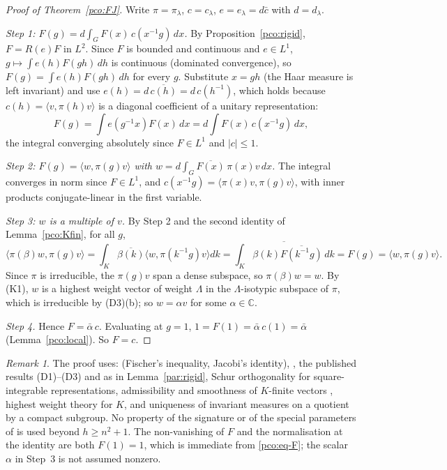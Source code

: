 \documentclass[10pt]{amsart}
\theoremstyle{definition}
\theoremstyle{remark}
\newtheorem{remark}[theorem]{Remark}
\newcommand{\C}{\mathbb C}
\begin{document}
\begin{proof}[Proof of Theorem~\ref{pco:FJ}]
Write $\pi=\pi_\lambda$, $c=c_\lambda$, $e=e_\lambda=d\bar c$ with $d=d_\lambda$.

\emph{Step 1: $F(g)=d\int_GF(x)\,c(x^{-1}g)\,dx$.} By Proposition~\ref{pco:rigid}, $F=R(e)F$ in
$L^2$. Since $F$ is bounded and continuous and $e\in L^1$, $g\mapsto\int e(h)F(gh)\,dh$ is
continuous (dominated convergence), so $F(g)=\int e(h)F(gh)\,dh$ for every $g$. Substitute $x=gh$
(the Haar measure is left invariant) and use $e(h)=d\,\overline{c(h)}=d\,c(h^{-1})$, which holds
because $c(h)=\langle v,\pi(h)v\rangle$ is a diagonal coefficient of a unitary representation:
\[
F(g)=\int e(g^{-1}x)F(x)\,dx=d\int F(x)\,c(x^{-1}g)\,dx ,
\]
the integral converging absolutely since $F\in L^1$ and $|c|\le1$.

\emph{Step 2: $F(g)=\langle w,\pi(g)v\rangle$ with $w=d\int_G\overline{F(x)}\,\pi(x)v\,dx$.} The
integral converges in norm since $F\in L^1$, and $c(x^{-1}g)=\langle\pi(x)v,\pi(g)v\rangle$, with inner
products conjugate-linear in the first variable.

\emph{Step 3: $w$ is a multiple of $v$.} By Step 2 and the second identity of Lemma~\ref{pco:Kfin},
for all $g$,
\[
\langle\pi(\beta)w,\pi(g)v\rangle=\int_K\overline{\beta(k)}\langle w,\pi(k^{-1}g)v\rangle dk
=\overline{\int_K\beta(k)\overline{F(k^{-1}g)}\,dk}=F(g)=\langle w,\pi(g)v\rangle .
\]
Since $\pi$ is irreducible, the $\pi(g)v$ span a dense subspace, so $\pi(\beta)w=w$. By (K1), $w$ is
a highest weight vector of weight $\Lambda$ in the $\Lambda$-isotypic subspace of $\pi$, which is
irreducible by (D3)(b); so $w=\alpha v$ for some $\alpha\in\C$.

\emph{Step 4.} Hence $F=\bar\alpha\,c$. Evaluating at $g=1$, $1=F(1)=\bar\alpha\,c(1)=\bar\alpha$
(Lemma~\ref{pco:local}). So $F=c$.
\end{proof}

\begin{remark}\label{pco:rem-FJ}
The proof uses: {\cite[Lemmas~5.4 and~5.5]{P51}} (Fischer's inequality, Jacobi's
identity), {\cite[Lemma~4.7(c)]{P51}}, the published results (D1)--(D3) and \cite{Dixmier} as in
Lemma~\ref{par:rigid}, Schur orthogonality for square-integrable representations, admissibility
and smoothness of $K$-finite vectors \cite[Theorem~8.1 and Proposition~8.5]{Knapp}, highest weight theory for $K$, and
uniqueness of invariant measures on a quotient by a compact subgroup. No property of the signature
or of the special parameters of {\cite[\S5.1]{P51}} is used beyond $h\ge n^2+1$. The
non-vanishing of $F$ and the normalisation at the identity are both $F(1)=1$, which is immediate
from \eqref{pco:eq-F}; the scalar $\alpha$ in Step~3 is not assumed nonzero.
\end{remark}
\end{document}
